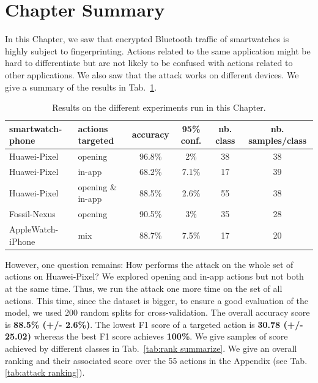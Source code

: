 \section{Chapter Summary}
\label{chapter summary}
In this Chapter, we saw that encrypted Bluetooth traffic of smartwatches is highly subject to fingerprinting. Actions related to the same application might be hard to differentiate but are not likely to be confused with actions related to other applications. We also saw that the attack works on different devices. We give a summary of the results in Tab.~\ref{tab:results summury}. 
\\

\begin{table}[ht]
\centering

 \begin{tabular}{@{}llcccc@{}} 
 \toprule
  smartwatch-phone & actions targeted & accuracy & 95\% conf. & nb. class & nb. samples/class \\ [0.5ex] 
 \midrule
 Huawei-Pixel & opening  & 96.8\% &  2\% & 38 & 38\\ 

 Huawei-Pixel & in-app & 68.2\% & 7.1\% & 17 & 39\\
 
 Huawei-Pixel & opening \& in-app & 88.5\% & 2.6\% & 55 & 38\\

 Fossil-Nexus & opening & 90.5\% & 3\% & 35 & 28\\
 
 AppleWatch-iPhone & mix & 88.7\% &  7.5\% & 17 & 20  \\
 
 \bottomrule
 
\end{tabular}

\caption{Results on the different experiments run in this Chapter.}
    \label{tab:results summury}
\end{table}


However, one question remains: How performs the attack on the whole set of actions on Huawei-Pixel? We explored opening and in-app actions but not both at the same time. Thus, we run the attack one more time on the set of all actions. This time, since the dataset is bigger, to ensure a good evaluation of the model, we used 200 random splits for cross-validation. The overall accuracy score is \textbf{88.5\% (+/- 2.6\%)}. The lowest F1 score of a targeted action is \textbf{30.78 (+/- 25.02)} whereas the best F1 score achieves \textbf{100\%}. We give samples of score achieved by different classes in Tab.~\ref{tab:rank summarize}.  We give an overall ranking and their associated score over the 55 actions in the Appendix (see Tab. \ref{tab:attack ranking}).
\\


